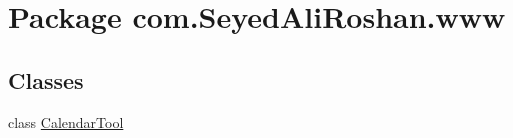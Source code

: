\hypertarget{namespacecom_1_1_seyed_ali_roshan_1_1www}{}\section{Package com.\+Seyed\+Ali\+Roshan.\+www}
\label{namespacecom_1_1_seyed_ali_roshan_1_1www}
\subsection*{Classes}
\begin{DoxyCompactItemize}
\item 
class \hyperlink{classcom_1_1_seyed_ali_roshan_1_1www_1_1_calendar_tool}{Calendar\+Tool}
\end{DoxyCompactItemize}

